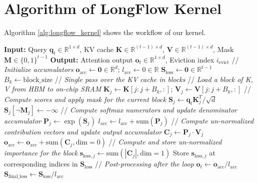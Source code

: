 \section{Algorithm of LongFlow Kernel}
Algorithm \ref{alg:longflow_kernel} shows the workflow of our kernel.
\begin{algorithm}[htbp]
\caption{LongFlow Fused Attention and Eviction Kernel}
\label{alg:longflow_kernel}
\begin{small}
\begin{algorithmic}[1]
\STATE \textbf{Input:} Query \( \mathbf{q}_t \in \mathbb{R}^{1 \times d} \), KV cache \( \mathbf{K} \in \mathbb{R}^{(t-1) \times d} \), \( \mathbf{V} \in \mathbb{R}^{(t-1) \times d} \), Mask \( \mathbf{M} \in \{0,1\}^{t-1} \)
\STATE \textbf{Output:} Attention output \( \mathbf{o}_t \in \mathbb{R}^{1 \times d} \), Eviction index \( i_{\text{evict}} \)
\STATE
\STATE // \textit{Initialize accumulators}
\STATE \( \mathbf{o}_{\text{acc}} \leftarrow \mathbf{0} \in \mathbb{R}^d \); 
\STATE \( l_{\text{acc}} \leftarrow 0 \in \mathbb{R} \) 
\STATE \( \mathbf{S}_{\text{loss}} \leftarrow \mathbf{0} \in \mathbb{R}^{t-1} \) 
\STATE \( B_k \leftarrow \text{block\_size} \)
\STATE
\STATE // \textit{Single pass over the KV cache in blocks}
\STATE // \textit{Load a block of K, V from HBM to on-chip SRAM}
\STATE \( \mathbf{K}_j \leftarrow \mathbf{K}[j:j+B_k, :] \); \quad \( \mathbf{V}_j \leftarrow \mathbf{V}[j:j+B_k, :] \)
\STATE
\STATE // \textit{Compute scores and apply mask for the current block}
\STATE \( \mathbf{S}_j \leftarrow \mathbf{q}_t \mathbf{K}_j^T / \sqrt{d} \)
\STATE \( \mathbf{S}_j[\neg \mathbf{M}_j] \leftarrow -\infty \)
\STATE
\STATE // \textit{Compute softmax numerators and update denominator accumulator}
\STATE \( \mathbf{P}_j \leftarrow \exp(\mathbf{S}_j) \)
\STATE \( l_{\text{acc}} \leftarrow l_{\text{acc}} + \text{sum}(\mathbf{P}_j) \)
\STATE
\STATE // \textit{Compute un-normalized contribution vectors and update output accumulator}
\STATE \( \mathbf{C}_j \leftarrow \mathbf{P}_j \cdot \mathbf{V}_j \) 
\STATE \( \mathbf{o}_{\text{acc}} \leftarrow \mathbf{o}_{\text{acc}} + \text{sum}(\mathbf{C}_j, \text{dim}=0) \)
\STATE
\STATE // \textit{Compute and store un-normalized importance for the block}
\STATE \( \mathbf{s}_{\text{loss}, j} \leftarrow \text{sum}(|\mathbf{C}_j|, \text{dim}=1) \) 
\STATE Store \( \mathbf{s}_{\text{loss}, j} \) at corresponding indices in \( \mathbf{S}_{\text{loss}} \)
\ENDFOR
\STATE
\STATE // \textit{Post-processing after the loop}
\STATE \( \mathbf{o}_t \leftarrow \mathbf{o}_{\text{acc}} / l_{\text{acc}} \) 
\STATE \( \mathbf{S}_{\text{final\_loss}} \leftarrow \mathbf{S}_{\text{loss}} / l_{\text{acc}} \) 


\end{algorithmic}
\end{small}
\end{algorithm}
